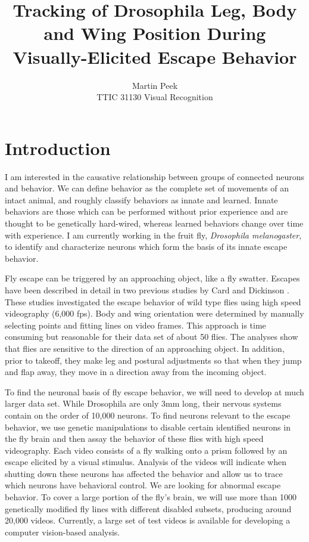 \documentclass[12pt]{amsart}
\begin{document}
\title{Tracking of Drosophila Leg, Body and Wing Position During Visually-Elicited Escape Behavior}
\author{Martin Peek\\ TTIC 31130 Visual Recognition}

\maketitle{}

\section*{Introduction}

I am interested in the causative relationship between groups of connected neurons and behavior. We can define behavior as the complete set of movements of an intact animal, and roughly classify behaviors as innate and learned. Innate behaviors are those which can be performed without prior experience and are thought to be genetically hard-wired, whereas learned behaviors change over time with experience. I am currently working in the fruit fly, {\it Drosophila melanogaster}, to identify and characterize neurons which form the basis of its innate escape behavior. 

Fly escape can be triggered by an approaching object, like a fly swatter. Escapes have been described in detail in two previous studies by Card and Dickinson\cite{card2008cb} \cite{card2008jeb}. These studies investigated the escape behavior of wild type flies using high speed videography (6,000 fps). Body and wing orientation were determined by manually selecting points and fitting lines on video frames. This approach is time consuming but reasonable for their data set of about 50 flies. The analyses show that flies are sensitive to the direction of an approaching object. In addition, prior to takeoff, they make leg and postural adjustments so that when they jump and flap away, they move in a direction away from the incoming object.

To find the neuronal basis of fly escape behavior, we will need to develop at much larger data set. While Drosophila are only 3mm long, their nervous systems contain on the order of 10,000 neurons. To find neurons relevant to the escape behavior, we use genetic manipulations to disable certain identified neurons in the fly brain and then assay the behavior of these flies with high speed videography. Each video consists of a fly walking onto a prism followed by an escape elicited by a visual stimulus. Analysis of the videos will indicate when shutting down these neurons has affected the behavior and allow us to trace which neurons have behavioral control. We are looking for abnormal escape behavior. To cover a large portion of the fly's brain, we will use more than 1000 genetically modified fly lines with different disabled subsets, producing around 20,000 videos. Currently, a large set of test videos is available for developing a computer vision-based analysis.
\end{document}
